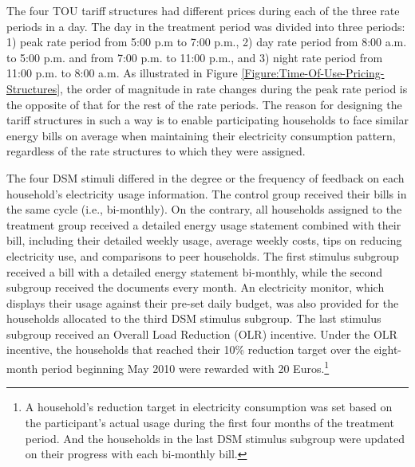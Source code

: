 The four TOU tariff structures had different prices during each of the three rate periods in a day. The day in the treatment period was divided into three periods: 1) peak rate period from 5:00 p.m to 7:00 p.m., 2) day rate period from 8:00 a.m. to 5:00 p.m. and from 7:00 p.m. to 11:00 p.m., and 3) night rate period from 11:00 p.m. to 8:00 a.m. As illustrated in Figure \ref{Figure:Time-Of-Use-Pricing-Structures}, the order of magnitude in rate changes during the peak rate period is the opposite of that for the rest of the rate periods. The reason for designing the tariff structures in such a way is to enable participating households to face similar energy bills on average when maintaining their electricity consumption pattern, regardless of the rate structures to which they were assigned. 

The four DSM stimuli differed in the degree or the frequency of feedback on each household's electricity usage information. The control group received their bills in the same cycle (i.e., bi-monthly). On the contrary, all households assigned to the treatment group received a detailed energy usage statement combined with their bill, including their detailed weekly usage, average weekly costs, tips on reducing electricity use, and comparisons to peer households. The first stimulus subgroup received a bill with a detailed energy statement bi-monthly, while the second subgroup received the documents every month. An electricity monitor, which displays their usage against their pre-set daily budget, was also provided for the households allocated to the third DSM stimulus subgroup. The last stimulus subgroup received an Overall Load Reduction (OLR) incentive. Under the OLR incentive, the households that reached their 10\% reduction target over the eight-month period beginning May 2010 were rewarded with 20 Euros.\footnote{A household's reduction target in electricity consumption was set based on the participant's actual usage during the first four months of the treatment period. And the households in the last DSM stimulus subgroup were updated on their progress with each bi-monthly bill.}
